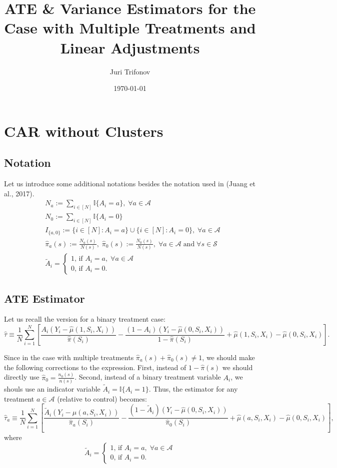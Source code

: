 \documentclass{article}
\title{ATE \& Variance Estimators for the Case with Multiple Treatments and Linear Adjustments}
\author{Juri Trifonov}
\date{\today}
\begin{document}
\maketitle

\section{CAR without Clusters}
\subsection*{Notation}

Let us introduce some additional notations besides the notation used in (Juang et al., 2017).
\begin{align}
& N_a := \sum_{i \in[N]} \mathbb I\{A_i = a\},\;\forall a \in \mathcal{A}  \nonumber \\
& N_0 := \sum_{i \in[N]} \mathbb I\{A_i = 0\} \nonumber \\
& I_{\{a,0\}} := \{i \in[N]: A_i = a\} \cup \{i \in[N]: A_i = 0\}, \;\forall a \in \mathcal{A} \nonumber \\
& \hat{\pi}_a(s) := \frac{N_a(s)}{N(s)}, \; \hat{\pi}_0(s) := \frac{N_0(s)}{N(s)},\;\forall a \in \mathcal{A} \; \text{and} \; \forall s \in \mathcal S   \nonumber \\
& \tilde{A}_i = \begin{cases}1\text{, if }A_i = a, \; \forall a \in \mathcal{A} \\ 0\text{, if }A_i = 0.\end{cases} \nonumber
\end{align}

\subsection*{ATE Estimator}

Let us recall the version for a binary treatment case:
\[\hat{\tau} \equiv \frac{1}{N} \sum_{i = 1}^{N} \left[ \frac{A_i (Y_i - \hat{\mu}(1, S_i, X_i))}{\hat{\pi}(S_i)} - \frac{(1 - A_i) (Y_i- \hat{\mu}(0,S_i,X_i))}{1 - \hat{\pi}(S_i)}  + \hat{\mu}(1, S_i, X_i) - \hat{\mu}(0, S_i, X_i)\right].\]

Since in the case with multiple treatments $\hat{\pi}_a(s) + \hat{\pi}_0(s) \neq 1$, we should make the following corrections to the expression. First, instead of $1 - \hat{\pi}(s)$ we should directly use $\hat{\pi}_0 = \frac{n_0(s)}{n(s)}$. Second, instead of a binary treatment variable $A_i$, we shouls use an indicator variable $\tilde{A}_i = \mathbb{I}\{A_i = 1\}$. Thus, the estimator for any treatment $a \in \mathcal A$ (relative to control) becomes:
\[\hat{\tau}_a \equiv \frac{1}{N} \sum_{i=1}^N \left[\frac{\tilde{A}_i (Y_i - \hat{\mu}(a, S_i, X_i))}{\hat{\pi}_a(S_i)} - \frac{(1 - \tilde{A}_i) (Y_i- \hat{\mu}(0,S_i,X_i))}{\hat{\pi}_0(S_i)} + \hat{\mu}(a, S_i, X_i) - \hat{\mu}(0, S_i, X_i)\right],\]
where 
\[\tilde{A}_i = \begin{cases}1\text{, if }A_i = a, \; \forall a \in \mathcal{A} \\ 0\text{, if }A_i = 0.\end{cases}\]
\end{document}
